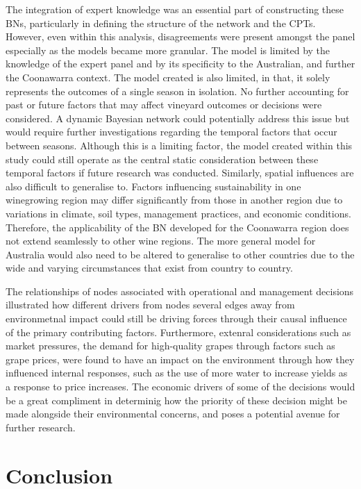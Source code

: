 \documentclass[fleqn,10pt]{wlscirep}
\begin{document}
The integration of expert knowledge was an essential part of constructing these BNs, particularly in defining the structure of the network and the CPTs. However, even within this analysis, disagreements were present amongst the panel especially as the models became more granular. The model is limited by the knowledge of the expert panel and by its specificity to the Australian, and further the Coonawarra context. The model created is also limited, in that, it solely represents the outcomes of a single season in isolation. No further accounting for past or future factors that may affect vineyard outcomes or decisions were considered. A dynamic Bayesian network could potentially address this issue but would require further investigations regarding the temporal factors that occur between seasons. Although this is a limiting factor, the model created within this study could still operate as the central static consideration between these temporal factors if future research was conducted. Similarly, spatial influences are also difficult to generalise to. Factors influencing sustainability in one winegrowing region may differ significantly from those in another region due to variations in climate, soil types, management practices, and economic conditions. Therefore, the applicability of the BN developed for the Coonawarra region does not extend seamlessly to other wine regions. The more general model for Australia would also need to be altered to generalise to other countries due to the wide and varying circumstances that exist from country to country.

The relationships of nodes associated with operational and management  decisions illustrated how different drivers from nodes several edges away from environmetnal impact could still be driving forces through their causal influence of the primary contributing factors. Furthermore, extenral considerations such as market pressures, the demand for high-quality grapes through factors such as grape prices, were found to have an impact on the environment through how they influenced internal responses, such as the use of more water to increase yields as a response to price increases. The economic drivers of some of the decisions would be a great compliment in determinig how the priority of these decision might be made alongside their environmental concerns, and poses a potential avenue for further research.

\section{Conclusion}
\end{document}
